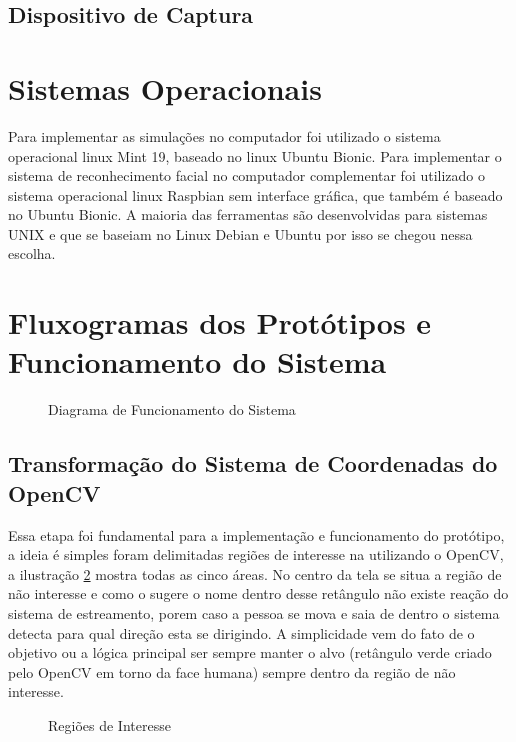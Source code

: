 \subsection{Dispositivo de Captura}

\section{Sistemas Operacionais}

Para implementar as simulações no computador foi utilizado o sistema operacional linux Mint 19, baseado no linux Ubuntu Bionic. Para implementar o sistema de reconhecimento facial no computador complementar foi utilizado o sistema operacional linux Raspbian sem interface gráfica, que também é baseado no Ubuntu Bionic.
A maioria das ferramentas são desenvolvidas para sistemas UNIX e que se baseiam no Linux Debian e Ubuntu por isso se chegou nessa escolha.

\section{Fluxogramas dos Protótipos e Funcionamento do Sistema}

\begin{figure}[H]
	\centering	
	\caption{Diagrama de Funcionamento do Sistema}
	\fontsize{9pt}{12pt}\selectfont
	\def\svgwidth{15cm}
	
	\label{fig:pross}
\end{figure}

\subsection{Transformação do Sistema de Coordenadas do OpenCV}

Essa etapa foi fundamental para a implementação e funcionamento do protótipo, a ideia é simples foram delimitadas regiões de interesse na utilizando o OpenCV, a ilustração \ref{fig:regint} mostra todas as cinco áreas. No centro da tela se situa a região de não interesse e como o sugere o nome dentro desse retângulo não existe reação do sistema de estreamento, porem caso a pessoa se mova e saia de dentro o sistema detecta para qual direção esta se dirigindo. A simplicidade vem do fato de o objetivo ou a lógica principal ser sempre manter o alvo (retângulo verde criado pelo OpenCV em torno da face humana) sempre dentro da região de não interesse.  

\begin{figure}[H]
	\centering
	\caption{Regiões de Interesse}
	
	\label{fig:regint}
\end{figure}


